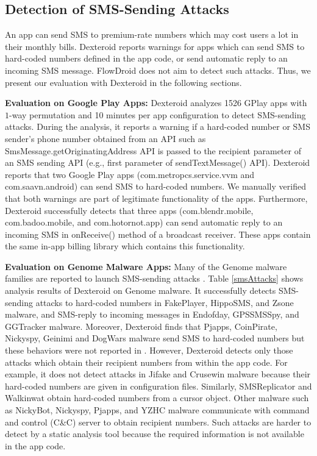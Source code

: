 \documentclass[10pt]{elsarticle}
\begin{document}
\subsection{Detection of SMS-Sending Attacks} 

An app can send SMS to premium-rate numbers which may cost users a lot in their monthly bills. Dexteroid reports warnings for apps which can send SMS to hard-coded numbers defined in the app code, or send automatic reply to an incoming SMS message. FlowDroid does not aim to detect such attacks. Thus, we present our evaluation with Dexteroid in the following sections.  


{\noindent \bf Evaluation on Google Play Apps:} Dexteroid analyzes 1526 GPlay apps with $1$-way permutation and 10 minutes per app configuration to detect SMS-sending attacks. During the analysis, it reports a warning if a hard-coded number or SMS sender's phone number obtained from an API such as {\ttfamily SmsMessage.getOriginatingAddress} API is passed to the recipient parameter of an SMS sending API (e.g., first parameter of {\ttfamily sendTextMessage()} API). Dexteroid reports that two Google Play apps ({\ttfamily com.metropcs.service.vvm} and {\ttfamily com.saavn.android}) can send SMS to hard-coded numbers. We manually verified that both warnings are part of legitimate functionality of the apps. Furthermore, Dexteroid successfully detects that three apps ({\ttfamily com.blendr.mobile}, {\ttfamily com.badoo.mobile}, and {\ttfamily com.hotornot.app}) can send automatic reply to an incoming SMS in {\ttfamily onReceive()} method of a broadcast receiver. These apps contain the same in-app billing library which contains this functionality.


{\noindent \bf Evaluation on Genome Malware Apps:} Many of the Genome malware families are reported to launch SMS-sending attacks \cite{dissectingAndroid}. Table \ref{smsAttacks} shows analysis results of Dexteroid on Genome malware. It successfully detects SMS-sending attacks to hard-coded numbers in FakePlayer, HippoSMS, and Zsone malware, and SMS-reply to incoming messages in Endofday, GPSSMSSpy, and GGTracker malware. Moreover, Dexteroid finds that Pjapps, CoinPirate, Nickyspy, Geinimi and DogWars malware send SMS to hard-coded numbers but these behaviors were not reported in \cite{dissectingAndroid}. However, Dexteroid detects only those attacks which obtain their recipient numbers from within the app code. For example, it does not detect attacks in Jifake and Crusewin malware because their hard-coded numbers are given in configuration files. Similarly, SMSReplicator and Walkinwat obtain hard-coded numbers from a {\ttfamily cursor} object. Other malware such as NickyBot, Nickyspy, Pjapps, and YZHC malware communicate with command and control (C\&C) server to obtain recipient numbers. Such attacks are harder to detect by a static analysis tool because the required information is not available in the app code.
\end{document}
